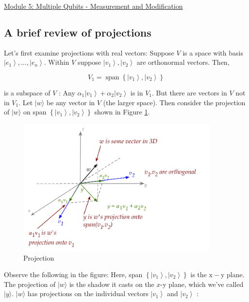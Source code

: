\documentclass[main.tex]{subfiles}
\begin{document}
\href{https://www2.seas.gwu.edu/~simhaweb/quantum/modules/module5/module5.html}{Module 5: Multiple Qubits - Measurement and Modification}

\subsection{A brief review of projections}

    Let's first examine projections with real vectors: Suppose $V$ is a space with basis $\left|e_{1}\right\rangle, \ldots,\left|e_{n}\right\rangle$. Within $V$ suppose $\left|v_{1}\right\rangle,\left|v_{2}\right\rangle$ are orthonormal vectors. Then,
    
    $$
    V_{1}=\operatorname{span}\left\{\left|v_{1}\right\rangle,\left|v_{2}\right\rangle\right\}
    $$
    
    is a subspace of $V$ : Any $\alpha_{1}\left|v_{1}\right\rangle+\alpha_{2}\left|v_{2}\right\rangle$ is in $V_{1}$. But there are vectors in $V$ not in $V_{1}$. Let $|w\rangle$ be any vector in $V$ (the larger space). Then consider the projection of $|w\rangle$ on span $\left\{\left|v_{1}\right\rangle,\left|v_{2}\right\rangle\right\}$ shown in Figure \ref{fig:01projection}.
    
    \begin{figure}
        \centering
        \includegraphics[width=4in]{notes/figs/n07/01projection.png}
        \caption{Projection}
        \label{fig:01projection}
    \end{figure} 
    
    Observe the following in the figure: Here, span $\left\{\left|v_{1}\right\rangle,\left|v_{2}\right\rangle\right\}$ is the $\mathrm{x}-\mathrm{y}$ plane. The projection of $|w\rangle$ is the shadow it casts on the $x$-y plane, which we've called $|y\rangle$. $|w\rangle$ has projections on the individual vectors $\left|v_{1}\right\rangle$ and $\left|v_{2}\right\rangle$ :
    
\end{document}
